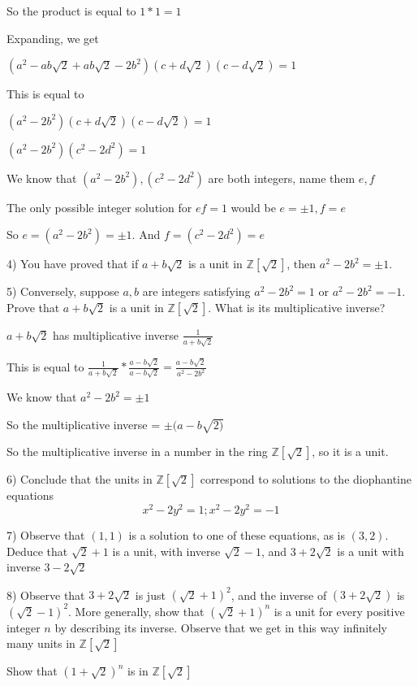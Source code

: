 \documentclass[11pt]{article}
\begin{document}
\begin{itemize}
	So the product is equal to $1 * 1 = 1$

	Expanding, we get 

	$(a^2 - ab\sqrt{2} + ab\sqrt{2} - 2b^2)(c + d\sqrt{2})(c - d\sqrt{2}) = 1$ 

	This is equal to

	$(a^2 - 2b^2)(c + d\sqrt{2})(c - d\sqrt{2}) = 1$

	$(a^2 - 2b^2)(c^2 - 2d^2) = 1$

	We know that $(a^2 - 2b^2), (c^2 - 2d^2)$ are both integers, name them $e,f$

	The only possible integer solution for $ef = 1$ would be $e = \pm 1, f = e$

	So $e = (a^2 - 2b^2) = \pm 1$. And $f = (c^2 - 2d^2) = e$

	4) You have proved that if $a + b\sqrt{2}$ is a unit in $\mathbb{Z}[\sqrt{2}]$, then $a^2 - 2b^2 = \pm 1.$

	5) Conversely, suppose $a, b$ are integers satisfying $a^2 - 2b^2 = 1$ or $a^2 - 2b^2 = -1$. Prove that $a + b\sqrt{2}$ is a unit in $\mathbb{Z}[\sqrt{2}]$. What is its multiplicative inverse?

	$a + b\sqrt{2}$ has multiplicative inverse $\frac{1}{a + b\sqrt{2}}$

	This is equal to $\frac{1}{a + b\sqrt{2}} * \frac{a - b\sqrt{2}}{a - b\sqrt{2}} = \frac{a - b\sqrt{2}}{a^2 - 2b^2}$

	We know that $a^2 - 2b^2 = \pm 1$

	So the multiplicative inverse = $\pm(a - b\sqrt{2)}$

	So the multiplicative inverse in a number in the ring $\mathbb{Z}[\sqrt{2}]$, so it is a unit.

	6) Conclude that the units in $\mathbb{Z}[\sqrt{2}]$ correspond to solutions to the diophantine equations $$x^2 - 2y^2 = 1; x^2 - 2y^2 = -1$$

	7) Observe that $(1,1)$ is a solution to one of these equations, as is $(3,2)$. Deduce that $\sqrt{2} + 1$ is a unit, with inverse $\sqrt{2} - 1$,  and $3 + 2\sqrt{2}$ is a unit with inverse $3 - 2\sqrt{2}$

	8) Observe that $3 + 2\sqrt{2}$ is just $(\sqrt{2} + 1)^2$, and the inverse of $(3 + 2\sqrt{2})$ is $(\sqrt{2} - 1)^2$. More generally, show that $(\sqrt{2} + 1)^n$ is a unit for every positive integer $n$ by describing its inverse. Observe that we get in this way infinitely many units in $\mathbb{Z}[\sqrt{2}]$

	Show that $(1 + \sqrt{2})^n$ is in $\mathbb{Z}[\sqrt{2}]$


\end{itemize}
\end{document}
